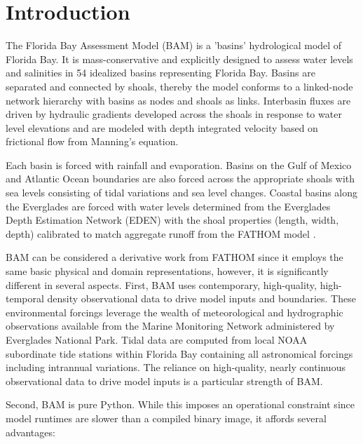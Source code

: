 \section{Introduction}
\label{sec:Introduction}
The Florida Bay Assessment Model (BAM) is a 'basins' hydrological model of Florida Bay.  It is mass-conservative and explicitly designed to assess water levels and salinities in 54 idealized basins representing Florida Bay.  Basins are separated and connected by shoals, thereby the model conforms to a linked-node network hierarchy with basins as nodes and shoals as links.  Interbasin fluxes are driven by hydraulic gradients developed across the shoals in response to water level elevations and are modeled with depth integrated velocity based on frictional flow from Manning's equation.  

Each basin is forced with rainfall and evaporation.  Basins on the Gulf of Mexico and Atlantic Ocean boundaries are also forced across the appropriate shoals with sea levels consisting of tidal variations and sea level changes.  Coastal basins along the Everglades are forced with water levels determined from the Everglades Depth Estimation Network (EDEN) \citep{Telis2014} with the shoal properties (length, width, depth) calibrated to match aggregate runoff from the FATHOM model \citep{Cosby2010}.

BAM can be considered a derivative work from FATHOM since it employs the same basic physical and domain representations, however, it is significantly different in several aspects.  First, BAM uses contemporary, high-quality, high-temporal density observational data to drive model inputs and boundaries.  These environmental forcings leverage the wealth of meteorological and hydrographic observations available from the Marine Monitoring Network administered by Everglades National Park.  Tidal data are computed from local NOAA subordinate tide stations within Florida Bay containing all astronomical forcings including intrannual variations.  The reliance on high-quality, nearly continuous observational data to drive model inputs is a particular strength of BAM.

Second, BAM is pure Python.  While this imposes an operational constraint since model runtimes are slower than a compiled binary image, it affords several advantages:

